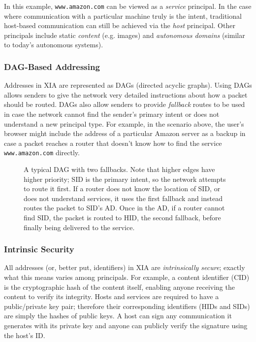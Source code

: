 \documentclass[11pt]{article}
\newcommand{\entrynode}[1]{
  \SetVertexNormal[Shape      = circle,
                   FillColor  = black,
                   LineWidth  = 0pt,
                   MinSize    = 0pt]
  \Vertex[L={\tiny\,}]{#1}
  \SetVertexNormal[Shape      = circle,
                   FillColor  = white,
                   LineWidth  = 2pt]
}
\begin{document}
In this example, \texttt{www.amazon.com} can be viewed as a \emph{service} principal. In the case where communication with a particular machine truly is the intent, traditional host-based communication can still be achieved via the \emph{host} principal. Other principals include static \emph{content} (e.g. images) and \emph{autonomous domains} (similar to today's autonomous systems).

\subsubsection{DAG-Based Addressing}
Addresses in XIA are represented as DAGs (directed acyclic graphs). Using DAGs allows senders to give the network very detailed instructions about how a packet should be routed. DAGs also allow senders to provide {\em fallback} routes to be used in case the network cannot find the sender's primary intent or does not understand a new principal type. For example, in the scenario above, the user's browser might include the address of a particular Amazon server as a backup in case a packet reaches a router that doesn't know how to find the service \texttt{www.amazon.com} directly.

\begin{figure}
\centering
{}
\caption{A typical DAG with two fallbacks. Note that higher edges have higher priority; SID is the primary intent, so the network attempts to route it first. If a router does not know the location of SID, or does not understand services, it uses the first fallback and instead routes the packet to SID's AD. Once in the AD, if a router cannot find SID, the packet is routed to HID, the second fallback, before finally being delivered to the service.}
\label{fig:proxy-service}
\end{figure}


\subsubsection{Intrinsic Security}
All addresses (or, better put, identifiers) in XIA are \emph{intrinsically secure}; exactly what this means varies among principals. For example, a content identifier (CID) is the cryptographic hash of the content itself, enabling anyone receiving the content to verify its integrity. Hosts and services are required to have a public/private key pair; therefore their corresponding identifiers (HIDs and SIDs) are simply the hashes of public keys. A host can sign any communication it generates with its private key and anyone can publicly verify the signature using the host's ID.
\end{document}
